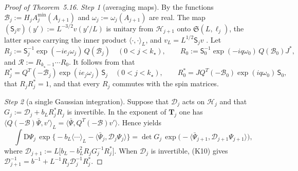\documentclass[11pt,letterpaper,reqno]{amsart}
\theoremstyle{definition}
\begin{document}
\begin{proof}[Proof of Theorem~5.16]
\emph{Step 1} (averaging maps).
By \cite[Propositions~5.31, 5.52\,(i), (iii)]{QEDI} the functions $\mathscr B_j:=H_jA^{\min}_j(A_{j+1})$ and $\omega_j:=\omega_j(A_{j+1})$ are real.
The map $(\mathsf S_jv)(y'):=L^{-3/2}v(y'/L)$ is unitary from $\mathcal H_{j+1}$ onto $\mathfrak S(L,\ell_j)$, the latter space carrying the inner product $\langle\cdot,\cdot\rangle_L$, and $v_L=L^{1/2}\mathsf S_jv$ \cite{QEDIII}.
Let
\begin{equation*}
R_j:=\mathsf S_j^{-1}\exp(-ie_j\omega_j)\,Q(\mathscr B_j)\quad(0<j<k_\star),\qquad R_0:=\mathsf S_0^{-1}\exp(-iq\omega_0)\,Q(\mathscr B_0)J^*,
\end{equation*}
and $\mathcal R:=R_{k_\star-1}\cdots R_0$.
It follows from \cite[(I.J1), (I.J3), (I.Q1), (I.Q2)]{QEDIII} that
\begin{equation*}
R_j^*=Q^T(-\mathscr B_j)\exp(ie_j\omega_j)\,\mathsf S_j\quad(0<j<k_\star),\qquad R_0^*=JQ^T(-\mathscr B_0)\exp(iq\omega_0)\,\mathsf S_0,
\end{equation*}
that $R_jR_j^*=1$, and that every $R_j$ commutes with the spin matrices.

\emph{Step 2} (a single Gaussian integration).
Suppose that $\mathcal D_j$ acts on $\mathcal H_j$ and that $G_j:=\mathcal D_j+b_LR_j^*R_j$ is invertible.
In the exponent of $\mathbf T_j$ \cite{QEDIII} one has $\langle Q(-\mathscr B)\bar\Psi,\allowbreak v'\rangle_L=\allowbreak \langle\bar\Psi,\allowbreak Q^T(-\mathscr B)v'\rangle$.
Hence \cite[Proposition~22.1\,(G2)$^{\mathrm w}$]{QEDIII} yields
\begin{equation*}
\int\mathrm D\Psi_j\,\exp\bigl\{-b_L\langle\cdots\rangle_L-\langle\bar\Psi_j,\mathcal D_j\Psi_j\rangle\bigr\}=\det G_j\,\exp\bigl(-\langle\bar\Psi_{j+1},\mathcal D_{j+1}\Psi_{j+1}\rangle\bigr),
\end{equation*}
where $\mathcal D_{j+1}:=L\bigl[b_L-b_L^2R_jG_j^{-1}R_j^*\bigr]$.
When $\mathcal D_j$ is invertible, (K10) gives $\mathcal D_{j+1}^{-1}=b^{-1}+L^{-1}R_j\mathcal D_j^{-1}R_j^*$.


\end{proof}
\end{document}
